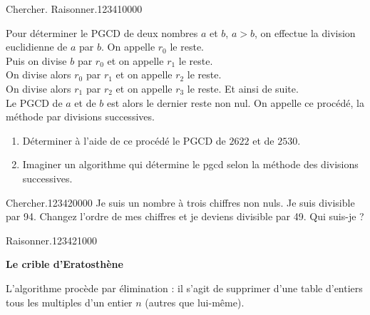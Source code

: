 \begin{pageParcourst}



 
\begin{ExoCt}{Chercher. Raisonner.}{1234}{1}{0}{0}{0}{0}

Pour déterminer le PGCD de deux nombres $a$ et $b$, $a>b$, on effectue la division euclidienne de $a$ par $b$. On appelle $r_0$ le reste. \\
Puis on divise $b$ par $r_0$ et on appelle $r_1$ le reste. \\
On divise alors $r_0$ par $r_1$ et on appelle $r_2$ le reste.\\ 
On divise alors $r_1$ par $r_2$ et on appelle $r_3$ le reste. Et ainsi de suite. \\ 
Le PGCD de $a$ et de $b$ est alors le dernier reste non nul.
On appelle ce procédé, la méthode par divisions successives.

\begin{enumerate}[leftmargin=*]

\item Déterminer à l'aide de ce procédé le PGCD de $2 622$ et de $2 530$. \vspace{4cm}
\item Imaginer un algorithme qui détermine le pgcd selon la méthode des divisions successives.
 
\end{enumerate}
 
\end{ExoCt}


 


\begin{ExoCt}{Chercher.}{1234}{2}{0}{0}{0}{0} 
Je suis un nombre à trois chiffres non nuls. Je suis divisible par 94. Changez l'ordre de mes chiffres et je deviens divisible par 49.
Qui suis-je ?   
\end{ExoCt}


\begin{ExoCt}{Raisonner.}{1234}{2}{1}{0}{0}{0}
 
 \begin{minipage}{0.5\linewidth} 
 
\textbf{Le crible d'Eratosthène}

L'algorithme procède par élimination : il s'agit de supprimer d'une table d'entiers tous les multiples d'un entier $n$ (autres que lui-même).


\end{minipage}
\end{ExoCt}
\end{pageParcourst}

